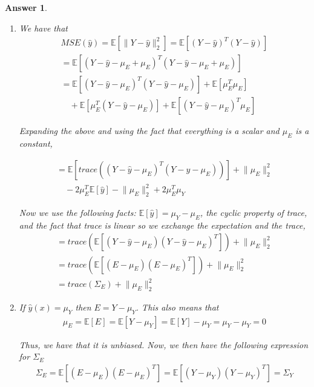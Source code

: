 \documentclass[12pt]{article}
\theoremstyle{colon}
\newtheorem*{answer}{Answer}
\begin{document}
\begin{answer}
  \

  \begin{enumerate}[label=\alph*)]
    \item We have that
      \begin{gather*}
        MSE(\hat{y}) = \mathbb{E} [\lVert Y - \hat{y} \rVert_2^2] = \mathbb{E} [(Y - \hat{y})^T (Y - \hat{y})] \\
        = \mathbb{E} [(Y - \hat{y} - \mu_E + \mu_E)^T (Y - \hat{y} - \mu_E + \mu_E)] \\
        = \mathbb{E} [(Y - \hat{y} - \mu_E)^T (Y - \hat{y} - \mu_E)] + \mathbb{E}[\mu_E^T \mu_E] \\
        \quad+ \mathbb{E} [\mu_E^T (Y - \hat{y} - \mu_E)] + \mathbb{E} [(Y - \hat{y} - \mu_E)^T \mu_E]
      \end{gather*}

      Expanding the above and using the fact that everything is a scalar and $\mu_E$ is a constant,

      \begin{gather*}
        = \mathbb{E} [trace((Y - \hat{y} - \mu_E)^T (Y - \hat{y} - \mu_E))] + \lVert \mu_E \rVert_2^2 \\
        \quad -2 \mu_E^T \mathbb{E}[\hat{y}] - \lVert \mu_E \rVert_2^2 + 2 \mu_E^T \mu_Y
      \end{gather*}

      Now we use the following facts: $\mathbb{E}[\hat{y}] = \mu_Y - \mu_E$, the cyclic property of trace, and the fact that trace is linear so we exchange the expectation and the trace,
      \begin{gather*}
        = trace( \mathbb{E} [(Y - \hat{y} - \mu_E)(Y - \hat{y} - \mu_E)^T]) + \lVert \mu_E \rVert_2^2 \\
        = trace( \mathbb{E} [(E - \mu_E)(E - \mu_E)^T]) + \lVert \mu_E \rVert_2^2 \\
        = trace(\Sigma_E) + \lVert \mu_E \rVert_2^2
      \end{gather*}

    \item If $\hat{y}(x) = \mu_Y$ then $E = Y - \mu_Y$. This also means that
      \begin{gather*}
        \mu_E = \mathbb{E}[E] = \mathbb{E}[Y - \mu_Y] = \mathbb{E}[Y] - \mu_Y = \mu_Y - \mu_Y = 0
      \end{gather*}

      Thus, we have that it is unbiased. Now, we then have the following expression for $\Sigma_E$
      \begin{gather*}
        \Sigma_E = \mathbb{E}[(E - \mu_E)(E- \mu_E)^T] = \mathbb{E}[(Y - \mu_Y)(Y - \mu_Y)^T] = \Sigma_Y
      \end{gather*}


\end{enumerate}
\end{answer}
\end{document}
